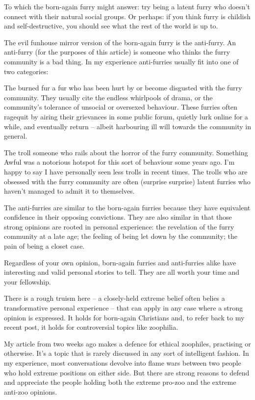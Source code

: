 To which the born-again furry might answer: try being a latent furry who doesn't connect with their natural social groups. Or perhaps: if you think furry is childish and self-destructive, you should see what the rest of the world is up to.

The evil funhouse mirror version of the born-again furry is the anti-furry. An anti-furry (for the purposes of this article) is someone who thinks the furry community is a bad thing. In my experience anti-furries usually fit into one of two categories:

\begin{description}
  \item{The burned fur} a fur who has been hurt by or become disgusted with the furry community. They usually cite the endless whirlpools of drama, or the community's tolerance of unsocial or oversexed behaviour. These furries often ragequit by airing their grievances in some public forum, quietly lurk online for a while, and eventually return -- albeit harbouring ill will towards the community in general.
  \item{The troll} someone who rails about the horror of the furry community. Something Awful was a notorious hotspot for this sort of behaviour some years ago. I'm happy to say I have personally seen less trolls in recent times. The trolls who are obsessed with the furry community are often (surprise surprise) latent furries who haven't managed to admit it to themselves.
\end{description}

The anti-furries are similar to the born-again furries because they have equivalent confidence in their opposing convictions. They are also similar in that those strong opinions are rooted in personal experience: the revelation of the furry community at a late age; the feeling of being let down by the community; the pain of being a closet case.

Regardless of your own opinion, born-again furries and anti-furries alike have interesting and valid personal stories to tell. They are all worth your time and your fellowship.

There is a rough truism here -- a closely-held extreme belief often belies a transformative personal experience -- that can apply in any case where a strong opinion is expressed. It holds for born-again Christians and, to refer back to my recent post, it holds for controversial topics like zoophilia.

My article from two weeks ago makes a defence for ethical zoophiles, practising or otherwise. It's a topic that is rarely discussed in any sort of intelligent fashion. In my experience, most conversations devolve into flame wars between two people who hold extreme positions on either side. But there are strong reasons to defend and appreciate the people holding both the extreme pro-zoo and the extreme anti-zoo opinions.

